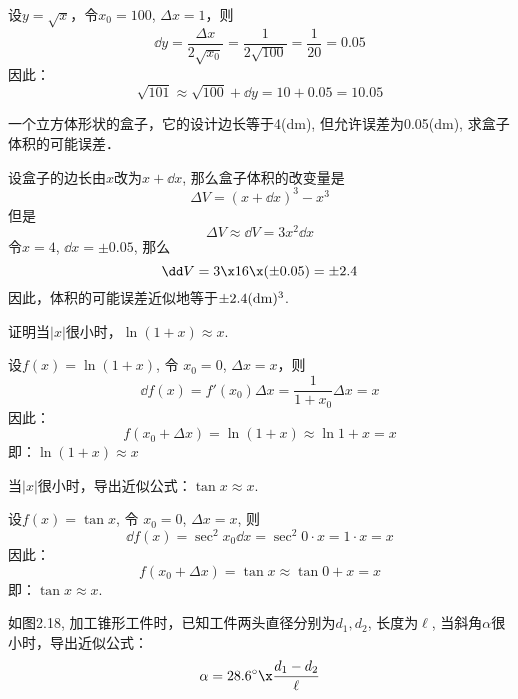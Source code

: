 \begin{solution}
设$y=\sqrt{x}$，令$x_0=100$, $\Delta x=1$，则
\[\dd y=\frac{\Delta x}{2\sqrt{x_0}}=\frac{1}{2\sqrt{100}}=\frac{1}{20}=0.05\]
因此：
\[\sqrt{101}\approx \sqrt{100}+\dd y=10+0.05=10.05\]
\end{solution}



\begin{example}
一个立方体形状的盒子，它的设计边长等于4(dm), 但允许误差为0.05(dm), 求盒子体积的可能误差．
\end{example}


\begin{solution}
设盒子的边长由$x$改为$x+\dd x$, 那么盒子体积的改变量是
\[\Delta V= (x+\dd x)^3-x^3\]
但是
\[\Delta V\approx \dd V=3x^2\dd x\]
令$x=4$, $\dd x=\pm 0.05$, 那么
\[\dd V=3\x16\x (\pm 0. 05) =\pm 2.4\]
因此，体积的可能误差近似地等于$\pm 2.4({\rm dm})^3$.
\end{solution}

\begin{example}
    证明当$|x|$很小时，$\ln(1+x)\approx x$.
\end{example}

\begin{solution}
    设$f(x)=\ln(1+x)$, 令 $x_0=0$, $\Delta x=x$，则
\[\dd f (x) =f' (x_0) \Delta x=\frac{1}{1+x_0}\Delta x=x\]
因此：
\[f (x_0+\Delta x) =\ln (1+x) \approx \ln 1+x=x\]
即：$\ln(1+x)\approx x$
\end{solution}


\begin{example}
    当$|x|$很小时，导出近似公式：$\tan x\approx x$.
\end{example}


\begin{solution}
    设$f(x)=\tan x$, 令 $x_0=0$, $\Delta x=x$, 则
\[\dd f (x) =\sec^2x_0 \dd x=\sec^2 0\cdot x=1\cdot x=x\]
因此：
\[f (x_0+\Delta x) =\tan x\approx \tan 0+x=x\]
即：$\tan x\approx x$.
\end{solution}

\begin{example}
如图2.18, 加工锥形工件时，已知工件两头直径分别为$d_1,d_2$, 长度为$\ell$, 当斜角$\alpha$很小时，导出近似公式：
\[\alpha=28.6^{\circ}\x\frac{d_1-d_2}{\ell}\]
\end{example}

\begin{figure}[htp]
    \centering
{}  
    \caption{}
\end{figure}

